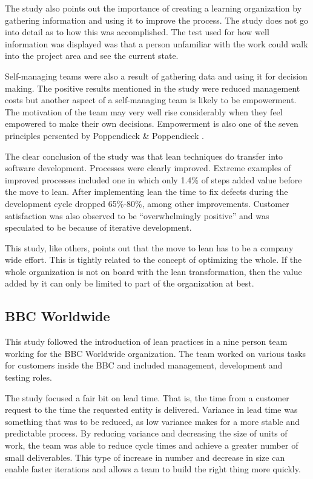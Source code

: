 The study also points out the importance of creating a learning organization by gathering information and using it to improve the process. The study does not go into detail as to how this was accomplished. The test used for how well information was displayed was that a person unfamiliar with the work could walk into the project area and see the current state.\cite{Middleton2005Lean}

Self-managing teams were also a result of gathering data and using it for decision making. The positive results mentioned in the study were reduced management costs\cite{Middleton2005Lean} but another aspect of a self-managing team is likely to be empowerment. The motivation of the team may very well rise considerably when they feel empowered to make their own decisions. Empowerment is also one of the seven principles persented by Poppendieck \& Poppendieck \cite{poppendieck2003lean}.

The clear conclusion of the study was that lean techniques do transfer into software development. Processes were clearly improved. Extreme examples of improved processes included one in which only 1.4\% of steps added value before the move to lean. After implementing lean the time to fix defects during the development cycle dropped 65\%-80\%, among other improvements. Customer satisfaction was also observed to be ``overwhelmingly positive'' and was speculated to be because of iterative development.\cite{Middleton2005Lean}

This study, like others, points out that the move to lean has to be a company wide effort.\cite{Middleton2005Lean} This is tightly related to the concept of optimizing the whole. If the whole organization is not on board with the lean transformation, then the value added by it can only be limited to part of the organization at best.


\subsection{BBC Worldwide}
\label{bbc}

This study followed the introduction of lean practices in a nine person team working for the BBC Worldwide organization. The team worked on various tasks for customers inside the BBC and included management, development and testing roles.\cite{Middleton2012Lean}

The study focused a fair bit on lead time. That is, the time from a customer request to the time the requested entity is delivered. Variance in lead time was something that was to be reduced, as low variance makes for a more stable and predictable process. By reducing variance and decreasing the size of units of work, the team was able to reduce cycle times and achieve a greater number of small deliverables.\cite{Middleton2012Lean} This type of increase in number and decrease in size can enable faster iterations and allows a team to build the right thing more quickly.

